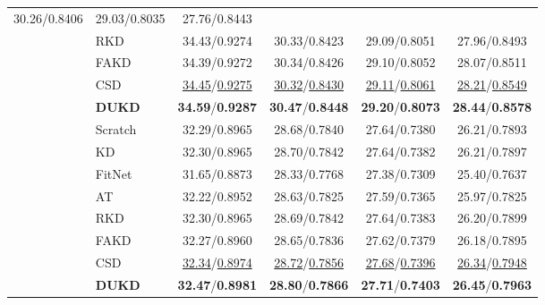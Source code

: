 \documentclass[10pt,twocolumn,letterpaper]{article}
\begin{document}
\begin{table}[]
{\begin{tabular}{@{\hspace{2pt}}l@{\hspace{1.5\tabcolsep}}lcccc@{\hspace{2pt}}}
  30.26/0.8406 &
  29.03/0.8035 &
  27.76/0.8443 \\
 &
  RKD &
  34.43/0.9274 &
  30.33/0.8423 &
  29.09/0.8051 &
  27.96/0.8493 \\
 &
  FAKD &
  34.39/0.9272 &
  30.34/0.8426 &
  29.10/0.8052 &
  28.07/0.8511 \\
 &
  CSD &
  \underline{34.45}/\underline{0.9275} &
  \underline{30.32}/\underline{0.8430} &
  \underline{29.11}/\underline{0.8061} &
  \underline{28.21}/\underline{0.8549} \\
 &
  \textbf{DUKD} &
  \textbf{34.59}/\textbf{0.9287} &
  \textbf{30.47}/\textbf{0.8448} &
  \textbf{29.20}/\textbf{0.8073} &
  \textbf{28.44}/\textbf{0.8578} \\ \midrule
\multirow{8}{*}{\texttimes4} &
  Scratch &
  32.29/0.8965 &
  28.68/0.7840 &
  27.64/0.7380 &
  26.21/0.7893 \\
 &
  KD &
  32.30/0.8965 &
  28.70/0.7842 &
  27.64/0.7382 &
  26.21/0.7897 \\
 &
  FitNet &
  31.65/0.8873 &
  28.33/0.7768 &
  27.38/0.7309 &
  25.40/0.7637 \\
 &
  AT &
  32.22/0.8952 &
  28.63/0.7825 &
  27.59/0.7365 &
  25.97/0.7825 \\
 &
  RKD &
  32.30/0.8965 &
  28.69/0.7842 &
  27.64/0.7383 &
  26.20/0.7899 \\
 &
  FAKD &
  32.27/0.8960 &
  28.65/0.7836 &
  27.62/0.7379 &
  26.18/0.7895 \\
 &
  CSD &
  \underline{32.34}/\underline{0.8974} &
  \underline{28.72}/\underline{0.7856} &
  \underline{27.68}/\underline{0.7396} &
  \underline{26.34}/\underline{0.7948} \\
 &
  \textbf{DUKD} &
  \textbf{32.47}/\textbf{0.8981} &
  \textbf{28.80}/\textbf{0.7866} &
  \textbf{27.71}/\textbf{0.7403} &
  \textbf{26.45}/\textbf{0.7963} \\ \bottomrule
\end{tabular}}
\end{table}
\end{document}
